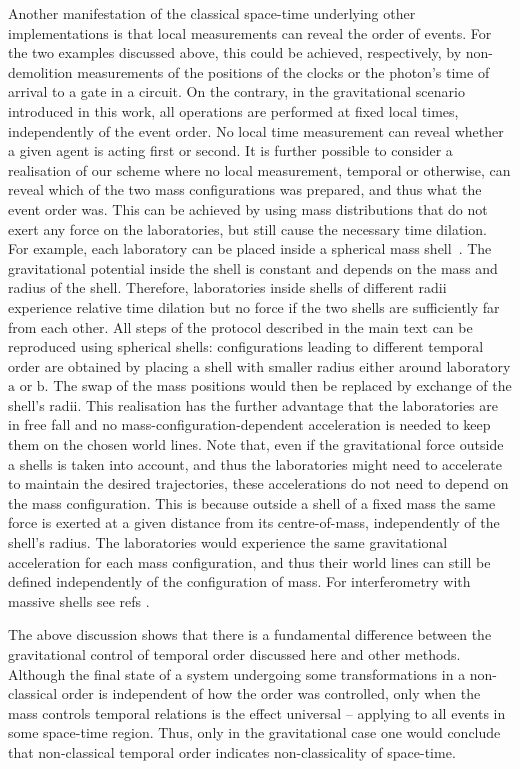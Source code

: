 \documentclass[a4paper,11pt]{article}
\begin{document}
Another manifestation of the classical space-time underlying other implementations is that local measurements can reveal the order of events. For the two examples discussed above, this could be achieved, respectively, by non-demolition measurements of
the positions of the clocks or the photon's time of arrival to a gate in a circuit. On the contrary, in the gravitational scenario introduced in this work, all operations are performed at fixed local times, independently of the event order. No local time measurement can reveal whether a given agent is acting first or second. It is further possible to consider a realisation of our scheme where {no local measurement}, temporal or otherwise, can reveal which of the two mass configurations was prepared, and thus what the event order was. This can be achieved by using mass distributions that do not exert any force on the laboratories, but still cause the necessary time dilation.  For example, each laboratory can be placed inside a spherical mass shell~\cite{Hohensee2012}. The gravitational potential inside the shell is constant and depends on the mass and radius of the shell. Therefore, laboratories inside shells of different radii experience relative time dilation but no force if the two shells are sufficiently far from each other.  All steps of the protocol described in the main text can be reproduced using spherical shells: configurations leading to different temporal order are obtained by placing a shell with smaller radius either around laboratory $\mathrm{a}$ or $\mathrm{b}$. The swap of the mass positions would then be replaced by exchange of the shell's radii. This realisation has the further advantage that the laboratories are in free fall and no mass-configuration-dependent acceleration is needed to keep them on the chosen world lines. Note that, even if the gravitational force outside a shells is taken into account, and thus the laboratories might need to accelerate to maintain the desired trajectories, these accelerations do not need to depend on the mass configuration. This is because outside a shell of a fixed mass the same force is exerted at a given distance from its centre-of-mass, independently of the shell's radius. The laboratories would  experience the same gravitational acceleration for each mass configuration, and thus their world lines can still be defined independently of the configuration of mass. For interferometry with massive shells see refs \cite{gooding2015bootstrapping, gooding2014self}.

The above discussion shows that there is a fundamental difference between {the gravitational control of temporal order discussed here} and other methods. Although the final state of a system undergoing some transformations in a non-classical order is independent of how the order was controlled, only when the mass controls temporal relations is the effect universal -- applying to {all} events in some space-time region.  Thus, only in the gravitational case one would conclude that non-classical temporal order indicates non-classicality of space-time.
\end{document}
